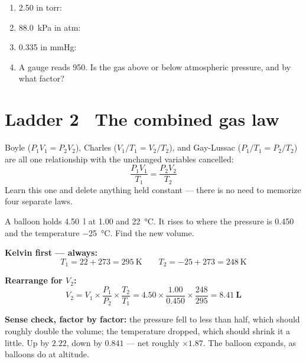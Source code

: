\documentclass{apchem-worksheet}
\begin{document}
\begin{yourturn}
\begin{enumerate}[leftmargin=*,itemsep=0.5em]
  \item \SI{2.50}{\atm} in torr: \workspace[1.4cm]
  \item \SI{88.0}{\kilo\pascal} in atm: \workspace[1.4cm]
  \item \SI{0.335}{\atm} in mmHg: \workspace[1.4cm]
  \item A gauge reads \SI{950}{\torr}. Is the gas above or below
        atmospheric pressure, and by what factor? \workspace[1.4cm]
\end{enumerate}
\end{yourturn}

\section*{\sffamily Ladder 2 \textbullet\ The combined gas law}

Boyle ($P_1V_1 = P_2V_2$), Charles ($V_1/T_1 = V_2/T_2$), and
Gay-Lussac ($P_1/T_1 = P_2/T_2$) are all one relationship with the
unchanged variables cancelled:
\[ \boxed{\;\frac{P_1V_1}{T_1} = \frac{P_2V_2}{T_2}\;} \]
Learn this one and delete anything held constant --- there is no need to
memorize four separate laws.

\begin{workedexample}
A balloon holds \SI{4.50}{\litre} at \SI{1.00}{\atm} and
\SI{22}{\celsius}. It rises to where the pressure is \SI{0.450}{\atm} and
the temperature \SI{-25}{\celsius}. Find the new volume.

\textbf{Kelvin first --- always:}
\[ T_1 = 22 + 273 = \SI{295}{\kelvin} \qquad
   T_2 = -25 + 273 = \SI{248}{\kelvin} \]

\textbf{Rearrange for $V_2$:}
\[ V_2 = V_1 \times \frac{P_1}{P_2} \times \frac{T_2}{T_1}
       = 4.50 \times \frac{1.00}{0.450} \times \frac{248}{295}
       = \mathbf{8.41~L} \]

\textbf{Sense check, factor by factor:} the pressure fell to less than
half, which should roughly double the volume; the temperature dropped,
which should shrink it a little. Up by $2.22$, down by $0.841$ ---
net roughly $\times 1.87$. The balloon expands, as balloons do at
altitude.
\end{workedexample}
\end{document}
